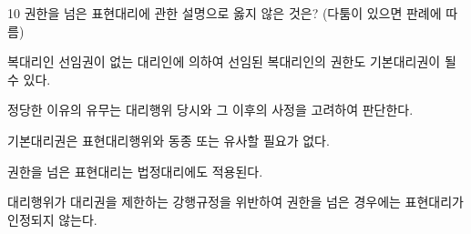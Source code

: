 \begin{question}{10}
권한을 넘은 표현대리에 관한 설명으로 옳지 않은 것은? (다툼이 있으면 판례에 따름)
\begin{choices}
  \item 복대리인 선임권이 없는 대리인에 의하여 선임된 복대리인의 권한도 기본대리권이 될 수 있다.
  \item 정당한 이유의 유무는 대리행위 당시와 그 이후의 사정을 고려하여 판단한다.
  \item 기본대리권은 표현대리행위와 동종 또는 유사할 필요가 없다.
  \item 권한을 넘은 표현대리는 법정대리에도 적용된다.
  \item 대리행위가 대리권을 제한하는 강행규정을 위반하여 권한을 넘은 경우에는 표현대리가 인정되지 않는다.
\end{choices}
\end{question}
